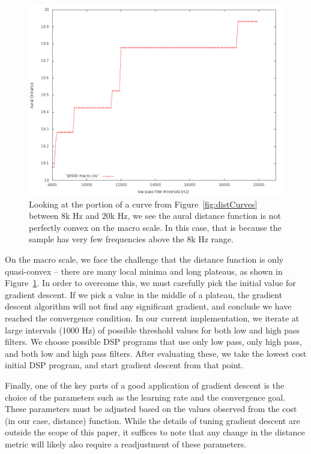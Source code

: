 \begin{figure}
\includegraphics[width=\columnwidth]{figs/distCurveMacro} 
\caption{Looking at the portion of a curve from Figure~\ref{fig:distCurves} between 8k Hz and 20k Hz, we see the aural distance function is not perfectly convex on the macro scale. In this case, that is because the sample has very few frequencies above the 8k Hz range.}
\label{fig:macroDist}
\end{figure}

On the macro scale, we face the challenge that the distance function is only quasi-convex -- there are many local minima and long plateaus, as shown in Figure~\ref{fig:macroDist}.
In order to overcome this, we must carefully pick the initial value for gradient descent.
If we pick a value in the middle of a plateau, the gradient descent algorithm will not find any significant gradient, and conclude we have reached the convergence condition.
In our current implementation, we iterate at large intervals (1000 Hz) of possible threshold values for both low and high pass filters.
We choose possible DSP programs that use only low pass, only high pass, and both low and high pass filters.
After evaluating these, we take the lowest cost initial DSP program, and start gradient descent from that point.

Finally, one of the key parts of a good application of gradient descent is the choice of the parameters such as the learning rate and the convergence goal.
These parameters must be adjusted based on the values observed from the cost (in our case, distance) function.
While the details of tuning gradient descent are outside the scope of this paper, it suffices to note that any change in the distance metric will likely also require a readjustment of these parameters.

